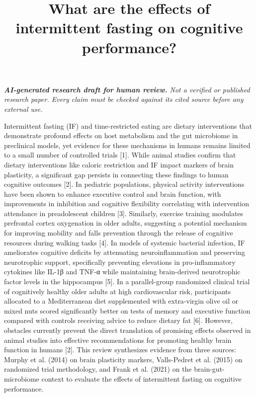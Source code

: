 \documentclass[11pt]{article}
\title{What are the effects of intermittent fasting on cognitive performance?}
\date{}
\begin{document}
\maketitle
\textit{\textbf{AI-generated research draft for human review.} Not a verified or published research paper. Every claim must be checked against its cited source before any external use.}\par

Intermittent fasting (IF) and time-restricted eating are dietary interventions that demonstrate profound effects on host metabolism and the gut microbiome in preclinical models, yet evidence for these mechanisms in humans remains limited to a small number of controlled trials [1]. While animal studies confirm that dietary interventions like caloric restriction and IF impact markers of brain plasticity, a significant gap persists in connecting these findings to human cognitive outcomes [2]. In pediatric populations, physical activity interventions have been shown to enhance executive control and brain function, with improvements in inhibition and cognitive flexibility correlating with intervention attendance in preadolescent children [3]. Similarly, exercise training modulates prefrontal cortex oxygenation in older adults, suggesting a potential mechanism for improving mobility and falls prevention through the release of cognitive resources during walking tasks [4]. In models of systemic bacterial infection, IF ameliorates cognitive deficits by attenuating neuroinflammation and preserving neurotrophic support, specifically preventing elevations in pro-inflammatory cytokines like IL-1β and TNF-α while maintaining brain-derived neurotrophic factor levels in the hippocampus [5]. In a parallel-group randomized clinical trial of cognitively healthy older adults at high cardiovascular risk, participants allocated to a Mediterranean diet supplemented with extra-virgin olive oil or mixed nuts scored significantly better on tests of memory and executive function compared with controls receiving advice to reduce dietary fat [6]. However, obstacles currently prevent the direct translation of promising effects observed in animal studies into effective recommendations for promoting healthy brain function in humans [2]. This review synthesizes evidence from three sources: Murphy et al. (2014) on brain plasticity markers, Valls-Pedret et al. (2015) on randomized trial methodology, and Frank et al. (2021) on the brain-gut-microbiome context to evaluate the effects of intermittent fasting on cognitive performance.
\end{document}
